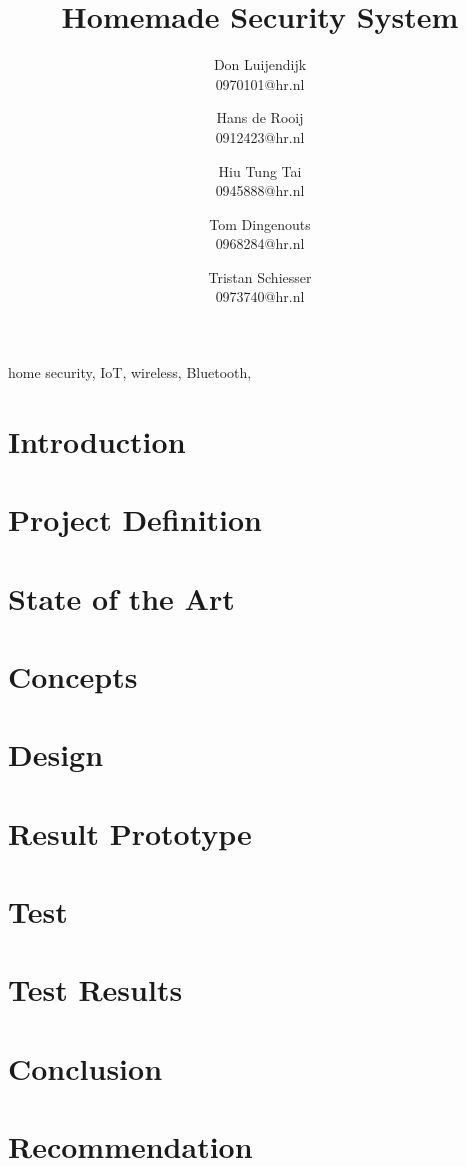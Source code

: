 \documentclass[conference]{IEEEtran}
\title{Homemade Security System}
\author{
	Don Luijendijk\\
	0970101@hr.nl
	\and 
	Hans de Rooij\\
	0912423@hr.nl
	\and 
	Hiu Tung Tai	\\
	0945888@hr.nl
	\and 
	Tom Dingenouts\\
	0968284@hr.nl
	\and 
	Tristan Schiesser\\
	0973740@hr.nl
}
\begin{document}
	\maketitle
	
	
	
	\begin{IEEEkeywords}
	home security, IoT, wireless, Bluetooth, 
	\end{IEEEkeywords}
	
	\section{Introduction}
	
	
	\section{Project Definition}
	
	
	\section{State of the Art}
	
	
	\section{Concepts}
	
	
	\section{Design}
	
	
	\section{Result Prototype}
	
	
	\section{Test}
	
	
	\section{Test Results}
	
	
	\section{Conclusion}
	
	
	\section{Recommendation}
	
	
	
		
		
\end{document}

